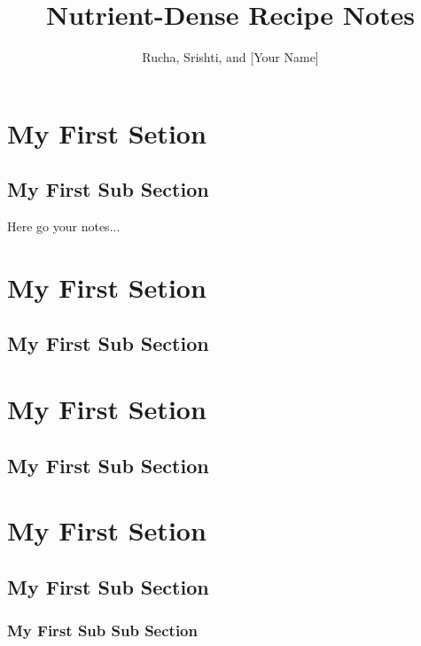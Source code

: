 \documentclass{notestyle}
\title{Nutrient-Dense Recipe Notes}
\author{Rucha, Srishti, and [Your Name]}
\begin{document}
\maketitle
\tableofcontents
\clearpage
\section{My First Setion}
\subsection{My First Sub Section}
Here go your notes...
\lipsum[2-4]

\section{My First Setion}
\subsection{My First Sub Section}
\lipsum[2-4]

\section{My First Setion}
\subsection{My First Sub Section}
\lipsum[2-4]

\section{My First Setion}
\subsection{My First Sub Section}
\subsubsection{My First Sub Sub Section}
\lipsum[2-4]
\end{document}
